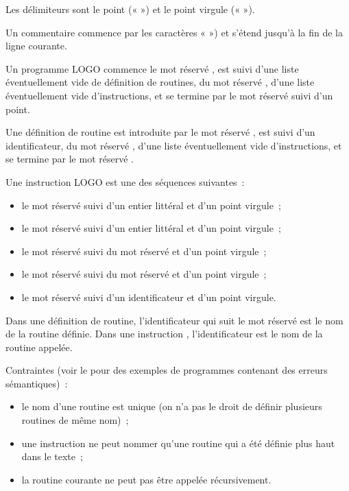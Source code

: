 Les délimiteurs sont le point («  ») et le point virgule (« \tpp{;} »).

Un commentaire commence par les caractères « \tpp{\//} ») et s'étend jusqu'à la fin de la ligne courante.



Un programme LOGO commence le mot réservé , est suivi d'une liste éventuellement vide de définition de routines, du mot réservé , d'une liste éventuellement vide d'instructions, et se termine par le mot réservé  suivi d'un point.

Une définition de routine est introduite par le mot réservé , est suivi d'un identificateur, du mot réservé , d'une liste éventuellement vide d'instructions, et se termine par le mot réservé .

Une instruction LOGO est une des séquences suivantes~:
\begin{itemize}
  \item le mot réservé  suivi d'un entier littéral et d'un point virgule~;
  \item le mot réservé  suivi d'un entier littéral et d'un point virgule~;
  \item le mot réservé  suivi du mot réservé  et d'un point virgule~;
  \item le mot réservé  suivi du mot réservé  et d'un point virgule~;
  \item le mot réservé  suivi d'un identificateur et d'un point virgule.
\end{itemize}


Dans une définition de routine, l'identificateur qui suit le mot réservé  est le nom de la routine définie. Dans une instruction , l'identificateur est le nom de la routine appelée.

Contraintes (voir le  pour des exemples de programmes contenant des erreurs sémantiques)~:
\begin{itemize}
  \item le nom d'une routine est unique (on n'a pas le droit de définir plusieurs routines de même nom)~;
  \item une instruction  ne peut nommer qu'une routine qui a été définie plus haut dans le texte~;
  \item la routine courante ne peut pas être appelée récursivement.
\end{itemize}

